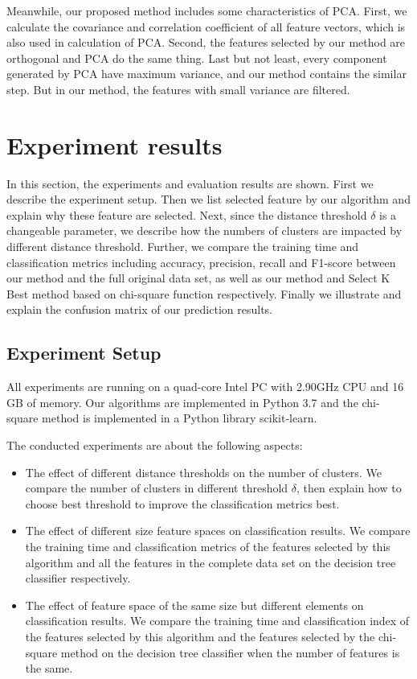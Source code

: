 \documentclass{ieeeaccess}
\theoremstyle{definition}
\begin{document}
Meanwhile, our proposed method includes some characteristics of PCA. First, we calculate the covariance and correlation coefficient of all feature vectors, which is also used in calculation of PCA. Second, the features selected by our method are orthogonal and PCA do the same thing. Last but not least, every component generated by PCA have maximum variance, and our method contains the similar step. But in our method, the features with small variance are filtered.

\section{Experiment results}
\label{sec:evaluation}

In this section, the experiments and evaluation results are shown. First we describe the experiment setup. Then we list selected feature by our algorithm and explain why these feature are selected. Next, since the distance threshold $\delta$ is a changeable parameter, we describe how the numbers of clusters are impacted by different distance threshold. Further, we compare the training time and classification metrics including accuracy, precision, recall and F1-score between our method and the full original data set, as well as our method and Select K Best method based on chi-square function respectively. Finally we illustrate and explain the confusion matrix of our prediction results.

\subsection{Experiment Setup}

All experiments are running on a quad-core Intel PC with 2.90GHz CPU and 16 GB of memory. Our algorithms are implemented in Python 3.7 and the chi-square method is implemented in a Python library scikit-learn\cite{sklearn}. 

The conducted experiments are about the following aspects:

\begin{itemize}
    \item The effect of different distance thresholds on the number of clusters. We compare the number of clusters in different threshold $\delta$, then explain how to choose best threshold to improve the classification metrics best. 
    \item The effect of different size feature spaces on classification results. We compare the training time and classification metrics of the features selected by this algorithm and all the features in the complete data set on the decision tree classifier respectively.
    \item The effect of feature space of the same size but different elements on classification results. We compare the training time and classification index of the features selected by this algorithm and the features selected by the chi-square method on the decision tree classifier when the number of features is the same. 
\end{itemize}
\end{document}
